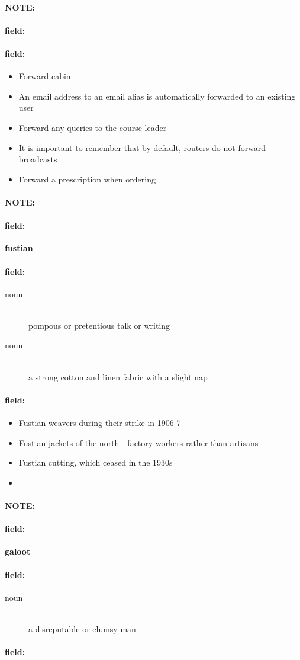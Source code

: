 \documentclass[12pt]{article}
\newenvironment{note}{\paragraph{NOTE:}}{}
\newenvironment{field}{\paragraph{field:}}{}
\begin{document}
\begin{note}
\begin{field}
\begin{description}
\end{description}
\end{field}

\begin{field}
\begin{itemize}
\item Forward cabin
\item An email address to an email alias is automatically forwarded to an existing user
\item Forward any queries to the course leader
\item It is important to remember that by default, routers do not forward broadcasts
\item Forward a prescription when ordering
\end{itemize}
\end{field}
\end{note}
\begin{note}
\begin{field}
\textbf{\large fustian}
\end{field}


\begin{field}
\begin{description}
\item[noun] \hfill \\ 
pompous or pretentious talk or writing

\item[noun] \hfill \\ 
a strong cotton and linen fabric with a slight nap

\end{description}
\end{field}

\begin{field}
\begin{itemize}
\item Fustian weavers during their strike in 1906-7
\item Fustian jackets of the north - factory workers rather than artisans
\item Fustian cutting, which ceased in the 1930s
\item 
\end{itemize}
\end{field}
\end{note}
\begin{note}
\begin{field}
\textbf{\large galoot}
\end{field}


\begin{field}
\begin{description}
\item[noun] \hfill \\ 
a disreputable or clumsy man

\end{description}
\end{field}

\begin{field}
\end{field}
\end{note}
\end{document}
